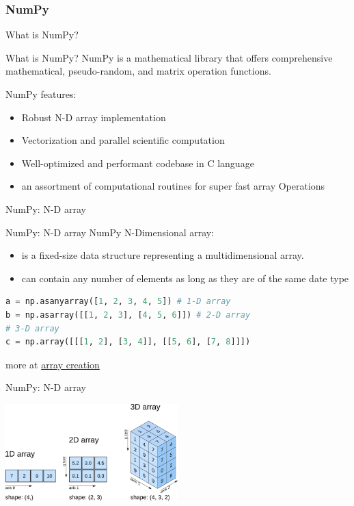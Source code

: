\documentclass{beamer}
\begin{document}
    \subsubsection{NumPy}
    \begin{frame}[fragile]{What is NumPy?}
        \begin{block}{What is NumPy?}
            NumPy is a mathematical library that offers comprehensive mathematical, pseudo-random, and matrix operation functions.
        \end{block}
        NumPy features:
        \begin{itemize}
            \item Robust N-D array implementation
            \item Vectorization and parallel scientific computation
            \item Well-optimized and performant codebase in C language
            \item an assortment of computational routines for super fast array Operations
        \end{itemize}
    \end{frame}
    \begin{frame}[fragile]{NumPy: N-D array}
        \begin{block}{NumPy: N-D array}
            NumPy N-Dimensional array:
            \begin{itemize}
                \item is a fixed-size data structure representing a multidimensional array.
                \item can contain any number of elements as long as they are of the same date type
            \end{itemize}
        \end{block}
        \begin{example}
            \begin{lstlisting}[language=Python]
a = np.asanyarray([1, 2, 3, 4, 5]) # 1-D array
b = np.asarray([[1, 2, 3], [4, 5, 6]]) # 2-D array
# 3-D array
c = np.array([[[1, 2], [3, 4]], [[5, 6], [7, 8]]])
            \end{lstlisting}
        \end{example}
        more at \href{https://numpy.org/doc/stable/reference/routines.array-creation.html}{array creation}
    \end{frame}
    \begin{frame}[fragile]{NumPy: N-D array}
        \begin{center}
            \includegraphics[width=0.5\textwidth]{figures/what-is-numpy-768x429.png}
        \end{center}
    \end{frame}
\end{document}
